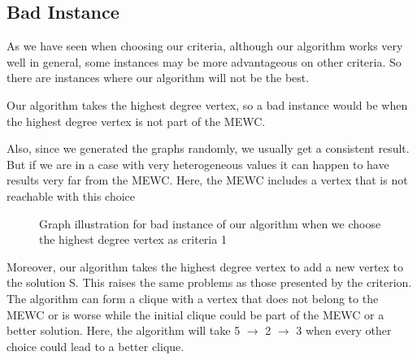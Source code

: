 
\subsection{Bad Instance}

As we have seen when choosing our criteria, although our algorithm works very well in general, some instances may be more advantageous on other criteria. So there are instances where our algorithm will not be the best. 
\bigskip

Our algorithm takes the highest degree vertex, so a bad instance would be when the highest degree vertex is not part of the MEWC. 
\bigskip

Also, since we generated the graphs randomly, we usually get a consistent result. But if we are in a case with very heterogeneous values it can happen to have results very far from the MEWC. Here, the MEWC includes a vertex that is not reachable with this choice

\begin{center}
    \begin{figure}[H]
        \centering
        \caption{Graph illustration for bad instance of our algorithm when we choose the highest degree vertex as criteria 1}
        \label{fig:bad-instance-vertex-highest-degree1}
    \end{figure}
\end{center}

Moreover, our algorithm takes the highest degree vertex to add a new vertex to the solution S. This raises the same problems as those presented by the criterion. The algorithm can form a clique with a vertex that does not belong to the MEWC or is worse while the initial clique could be part of the MEWC or a better solution. Here, the algorithm will take 5 $\rightarrow$ 2 $\rightarrow$ 3 when every other choice could lead to a better clique. 

